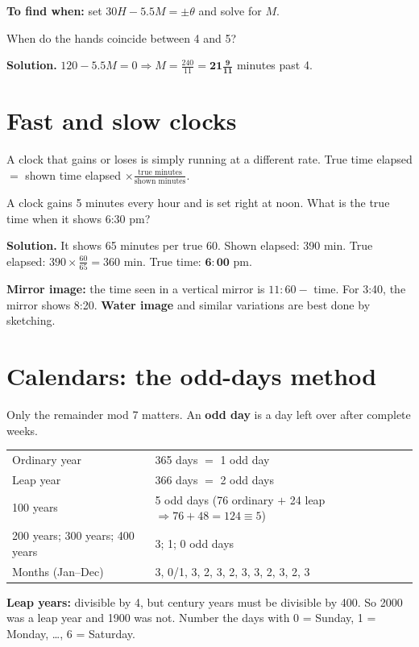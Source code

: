 \documentclass[11pt,a4paper,openany]{report}
\begin{document}
\textbf{To find when:} set $30H-5.5M=\pm\theta$ and solve for $M$.

\begin{example}
When do the hands coincide between 4 and 5?

\textbf{Solution.} $120-5.5M=0\Rightarrow M=\frac{240}{11}=\mathbf{21\frac9{11}}$ minutes past 4.
\end{example}

\section{Fast and slow clocks}
A clock that gains or loses is simply running at a different rate. True time elapsed $=$ shown time elapsed $\times\frac{\text{true minutes}}{\text{shown minutes}}$.

\begin{example}
A clock gains 5 minutes every hour and is set right at noon. What is the true time when it shows 6:30 pm?

\textbf{Solution.} It shows 65 minutes per true 60. Shown elapsed: 390 min. True elapsed: $390\times\frac{60}{65}=360$ min. True time: $\mathbf{6{:}00}$ pm.
\end{example}

\textbf{Mirror image:} the time seen in a vertical mirror is $11{:}60-$ time. For 3:40, the mirror shows 8:20. \textbf{Water image} and similar variations are best done by sketching.

\section{Calendars: the odd-days method}
Only the remainder mod 7 matters. An \textbf{odd day} is a day left over after complete weeks.
\begin{center}\small
\begin{tabular}{ll}
\toprule
Ordinary year & 365 days $=$ 1 odd day\\
Leap year & 366 days $=$ 2 odd days\\
100 years & 5 odd days (76 ordinary $+$ 24 leap $\Rightarrow76+48=124\equiv5$)\\
200 years; 300 years; 400 years & 3; 1; 0 odd days\\
Months (Jan--Dec) & 3, 0/1, 3, 2, 3, 2, 3, 3, 2, 3, 2, 3\\
\bottomrule
\end{tabular}
\end{center}
\textbf{Leap years:} divisible by 4, but century years must be divisible by 400. So 2000 was a leap year and 1900 was not. Number the days with 0 = Sunday, 1 = Monday, \dots, 6 = Saturday.
\end{document}
